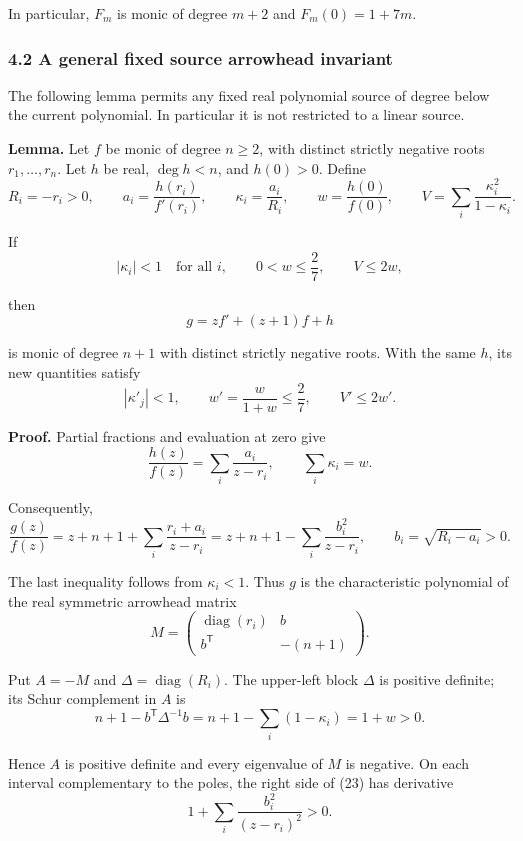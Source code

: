 \documentclass[
  11pt,
  a4paper,
]{article}
\begin{document}
In particular, \(F_m\) is monic of degree \(m+2\) and \(F_m(0)=1+7m\).

\subsubsection{4.2 A general fixed source arrowhead
invariant}\label{a-general-fixed-source-arrowhead-invariant}

The following lemma permits any fixed real polynomial source of degree
below the current polynomial. In particular it is not restricted to a
linear source.

\textbf{Lemma.} Let \(f\) be monic of degree \(n\geq2\), with distinct
strictly negative roots \(r_1,\ldots,r_n\). Let \(h\) be real,
\(\deg h<n\), and \(h(0)>0\). Define
\nopagebreak
\[
R_i=-r_i>0,\qquad a_i=\frac{h(r_i)}{f'(r_i)},\qquad
\kappa_i=\frac{a_i}{R_i},\qquad
w=\frac{h(0)}{f(0)},\qquad
V=\sum_i\frac{\kappa_i^2}{1-\kappa_i}.
\]

If
\nopagebreak
\[
|\kappa_i|<1\quad\text{for all }i,\qquad
0<w\leq\frac27,\qquad V\leq2w,\tag{21}
\]

then
\nopagebreak
\[
g=zf'+(z+1)f+h
\]

is monic of degree \(n+1\) with distinct strictly negative roots. With
the same \(h\), its new quantities satisfy
\nopagebreak
\[
|\kappa'_j|<1,\qquad
w'=\frac{w}{1+w}\leq\frac27,\qquad V'\leq2w'.\tag{22}
\]

\textbf{Proof.} Partial fractions and evaluation at zero give
\nopagebreak
\[
\frac{h(z)}{f(z)}=\sum_i\frac{a_i}{z-r_i},\qquad
\sum_i\kappa_i=w.
\]

Consequently,
\nopagebreak
\[
\frac{g(z)}{f(z)}
=z+n+1+\sum_i\frac{r_i+a_i}{z-r_i}
=z+n+1-\sum_i\frac{b_i^2}{z-r_i},\qquad
b_i=\sqrt{R_i-a_i}>0.\tag{23}
\]

The last inequality follows from \(\kappa_i<1\). Thus \(g\) is the
characteristic polynomial of the real symmetric arrowhead matrix
\nopagebreak
\[
M=\begin{pmatrix}
\operatorname{diag}(r_i)&b\\
b^{\mathsf T}&-(n+1)
\end{pmatrix}.
\]

Put \(A=-M\) and \(\Delta=\operatorname{diag}(R_i)\). The upper-left
block \(\Delta\) is positive definite; its Schur complement in \(A\) is
\nopagebreak
\[
n+1-b^{\mathsf T}\Delta^{-1}b
=n+1-\sum_i(1-\kappa_i)=1+w>0.
\]

Hence \(A\) is positive definite and every eigenvalue of \(M\) is
negative. On each interval complementary to the poles, the right side of
(23) has derivative
\nopagebreak
\[
1+\sum_i\frac{b_i^2}{(z-r_i)^2}>0.
\]
\end{document}
